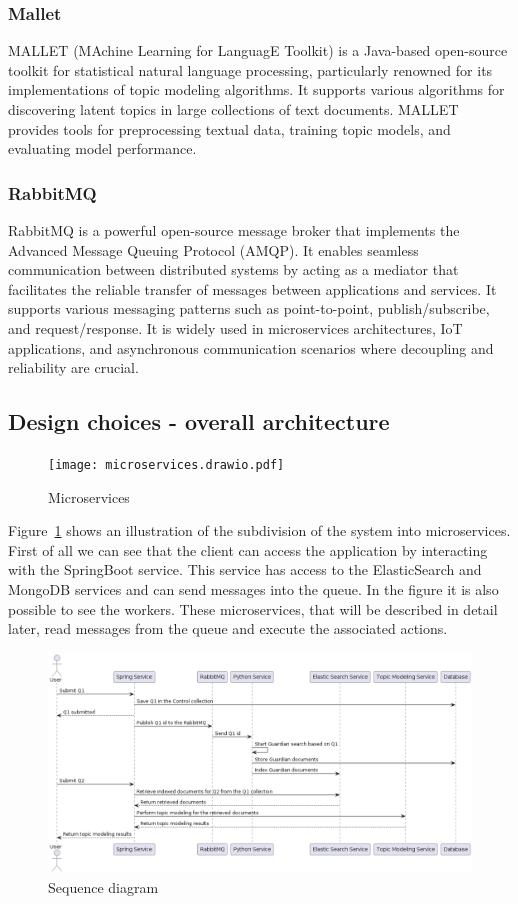 \subsubsection{Mallet}
MALLET (MAchine Learning for LanguagE Toolkit) is a Java-based open-source toolkit for statistical natural
language processing, particularly renowned for its implementations of topic modeling algorithms. It supports
various algorithms for discovering latent topics in large collections of text documents. MALLET provides tools
for preprocessing textual data, training topic models, and evaluating model performance. \cite{mallet}

\subsubsection{RabbitMQ}
RabbitMQ is a powerful open-source message broker that implements the Advanced Message Queuing Protocol (AMQP).
It enables seamless communication between distributed systems by acting as a mediator that facilitates the
reliable transfer of messages between applications and services. It supports various messaging patterns such
as point-to-point, publish/subscribe, and request/response. It is widely used in microservices architectures,
IoT applications, and asynchronous communication scenarios where decoupling and reliability are crucial.
\cite{rabbitmq}

\clearpage


\subsection{Design choices - overall architecture}
\begin{figure}[ht]
    \centering
    \texttt{[image: microservices.drawio.pdf]}
    \caption{Microservices}
    \label{fig:microservices}
\end{figure}

Figure~\ref{fig:microservices} shows an illustration of the subdivision of
the system into microservices. First of all we can see that the client can
access the application by interacting with the SpringBoot service.
This service has access to the ElasticSearch and MongoDB services and can
send messages into the queue. In the figure it is also possible to see
the workers. These microservices, that will be described in detail
later, read messages from the queue and execute the associated actions.

\clearpage

\begin{figure}[ht]
    \centering
    \includegraphics[width=0.7\linewidth]{figures/sequenceDiagram.png}
    \caption{Sequence diagram}
    \label{fig:seqDiagram}
\end{figure}

